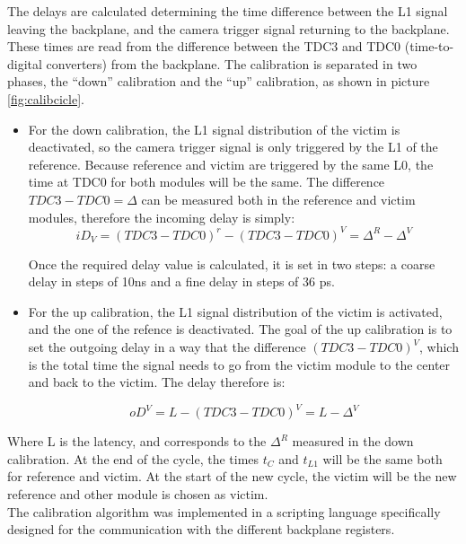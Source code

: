 \documentclass[main.tex]{subfiles}
\begin{document}
The delays are calculated determining the time difference between the L1 signal leaving the backplane, and the camera trigger signal returning to the backplane. These times are read from the difference between the TDC3 and TDC0 (time-to-digital converters) from the backplane. The calibration is separated in two phases, the ``down'' calibration and the ``up'' calibration, as shown in picture \ref{fig:calibcicle}.

\begin{itemize}

\item For the down calibration, the L1 signal distribution of the victim is deactivated, so the camera trigger signal is only triggered by the L1 of the reference. Because reference and victim are triggered by the same L0, the time at TDC0 for both modules will be the same. The difference $TDC3-TDC0 =\Delta$  can be measured both in the reference and victim modules, therefore the incoming delay is simply:
  \begin{equation}
    iD_{V} = (TDC3-TDC0)^{r}-(TDC3-TDC0)^{V} = \Delta^{R}-\Delta^{V}
  \end{equation}
  
  Once the required delay value is calculated, it is set in two steps: a coarse delay in steps of 10ns and a fine delay in steps of 36 ps.
  
\item For the up calibration, the L1 signal distribution of the victim is activated, and the one of the refence is deactivated. The goal of the up calibration is to set the outgoing delay in a way that the difference $(TDC3-TDC0)^V$, which is the total time the signal needs to go from the victim module to the center and back to the victim. The delay therefore is:

  \begin{equation}
    oD^{V} = L - (TDC3-TDC0)^V = L-\Delta^V
  \end{equation}
\end{itemize}

Where L is the latency, and corresponds to the $\Delta^{R}$ measured in the down calibration.
At the end of the cycle, the times $t_C$ and $t_{L1}$ will be the same both for reference and victim. At the start of the new cycle, the victim will be the new reference and other module is chosen as victim.\\
The calibration algorithm was implemented in a scripting language specifically designed for the communication with the different backplane registers.
\end{document}
